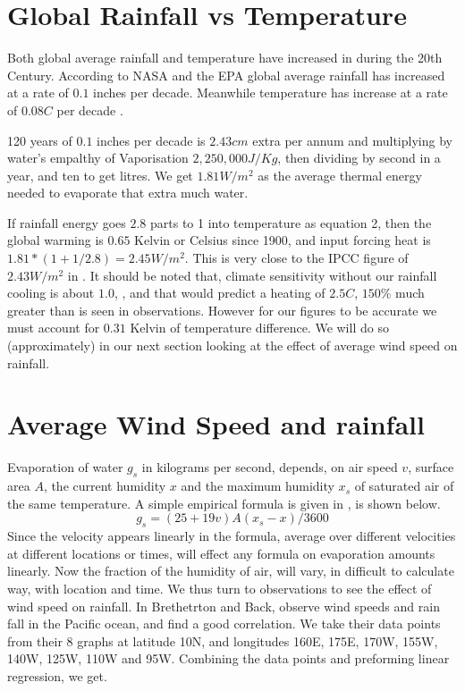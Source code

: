 \documentclass{book}
\begin{document}
	
	\section{Global Rainfall vs Temperature}
	
	Both global average rainfall and temperature have increased in during the 20th Century. According to NASA and the EPA \cite{EPARain} global average rainfall has increased at a rate of $0.1$ inches per decade.
	Meanwhile temperature has increase at a rate of $0.08 C$ per decade \cite{GlobTemp}.
	
   120 years of $0.1$ inches per decade is $2.43 cm$ extra per annum and multiplying by water's empalthy of Vaporisation $2,250,000 J/Kg$, then dividing by second in a year, and ten to get litres. We get $1.81 W/m^2$ as the average thermal energy needed to evaporate that extra much water.
   
   If rainfall energy goes $2.8$ parts to 1 into temperature as equation 2, then the global warming is $0.65$  Kelvin or Celsius since 1900, and input forcing heat is $1.81*(1+1/2.8)= 2.45 W/m^2$. This is very close to the IPCC figure of $2.43 W/m^2$ in \cite{Radiative}. It should be noted that, climate sensitivity without our rainfall cooling is about $1.0$, \cite{wikisense}, and that would predict a heating of $2.5C$, $150\% $ much greater than is seen in observations. However for our figures to be accurate we must account for $0.31$ Kelvin of temperature difference. We will do so (approximately) in our next section looking at the effect of average wind speed on rainfall.
   
   \section{Average Wind Speed and rainfall}
   
   	Evaporation of water $g_s$ in kilograms per second, depends, on air speed $v$, surface area $A$, the current humidity $x$ and the maximum humidity $x_s$ of saturated air of the same temperature. A simple empirical formula is given in \cite{EngTB1}, is shown below.
   \begin{equation}
   	g_s = (25 + 19v) A (x_s - x)/3600 
   \end{equation}
   Since the velocity appears linearly in the formula, average over different velocities at different locations or times, will effect any formula on evaporation amounts linearly. Now the fraction of the humidity of air, will vary, in  difficult to calculate way, with location and time. We thus turn to observations to see the effect of wind speed on rainfall. In \cite{Bretherton} Brethetrton and Back, observe wind speeds and rain fall in the Pacific ocean, and find a good correlation. We take their data points from their 8 graphs at latitude 10N, and longitudes 160E, 175E, 170W, 155W, 140W, 125W, 110W and 95W. Combining the data points and preforming
   linear regression, we get.
   
\end{document}
